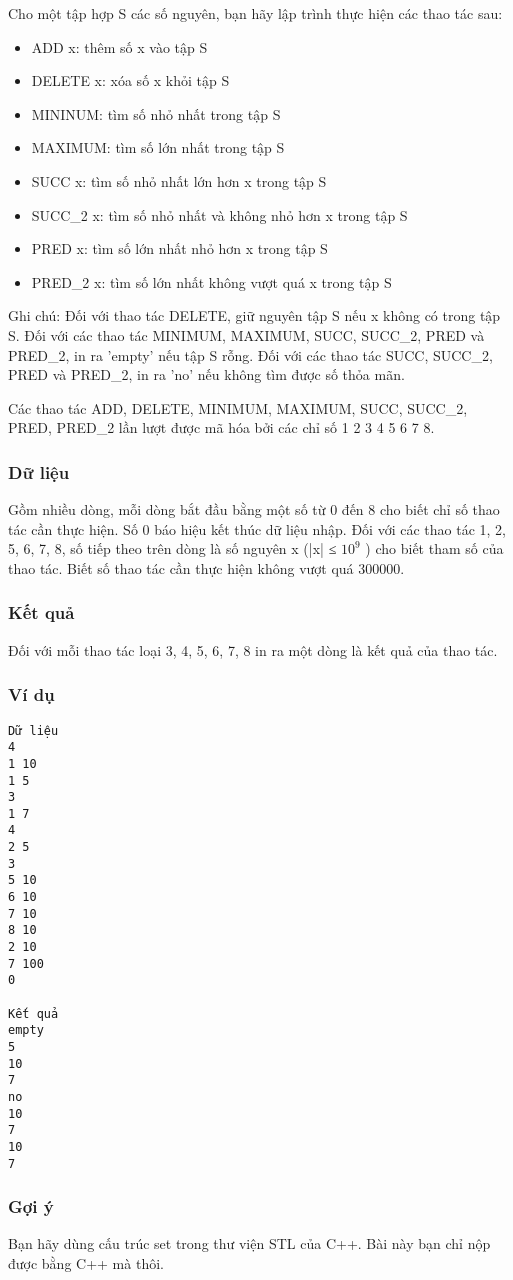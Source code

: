 



   Cho một tập hợp S các số nguyên, bạn hãy lập trình thực hiện các thao tác sau:  
\begin{itemize}
	\item     ADD x: thêm số x vào tập S   
	\item     DELETE x: xóa số x khỏi tập S   
	\item     MININUM: tìm số nhỏ nhất trong tập S   
	\item     MAXIMUM: tìm số lớn nhất trong tập S   
	\item     SUCC x: tìm số nhỏ nhất lớn hơn x trong tập S   
	\item     SUCC\_2 x: tìm số nhỏ nhất và không nhỏ hơn x trong tập S   
	\item     PRED x: tìm số lớn nhất nhỏ hơn x trong tập S   
	\item     PRED\_2 x: tìm số lớn nhất không vượt quá x trong tập S   
\end{itemize}

   Ghi chú: Đối với thao tác DELETE, giữ nguyên tập S nếu x không có trong tập S. Đối với các thao tác MINIMUM, MAXIMUM, SUCC, SUCC\_2, PRED và PRED\_2, in ra 'empty' nếu tập S rỗng. Đối với các thao tác SUCC, SUCC\_2, PRED và PRED\_2, in ra 'no' nếu không tìm được số thỏa mãn.  

   Các thao tác ADD, DELETE, MINIMUM, MAXIMUM, SUCC, SUCC\_2, PRED, PRED\_2 lần lượt được mã hóa bởi các chỉ số 1 2 3 4 5 6 7 8.  

\subsubsection{   Dữ liệu  }

   Gồm nhiều dòng, mỗi dòng bắt đầu bằng một số từ 0 đến 8 cho biết chỉ số thao tác cần thực hiện. Số 0 báo hiệu kết thúc dữ liệu nhập. Đối với các thao tác 1, 2, 5, 6, 7, 8, số tiếp theo trên dòng là số nguyên x (|x| ≤ $10^{9}$   ) cho biết tham số của thao tác. Biết số thao tác cần thực hiện không vượt quá 300000.  

\subsubsection{   Kết quả  }

   Đối với mỗi thao tác loại 3, 4, 5, 6, 7, 8 in ra một dòng là kết quả của thao tác.  

\subsubsection{   Ví dụ  }
\begin{verbatim}
Dữ liệu
4
1 10
1 5
3
1 7
4
2 5
3
5 10
6 10
7 10
8 10
2 10
7 100
0

Kết quả
empty
5
10
7
no
10
7
10
7
\end{verbatim}

\subsubsection{   Gợi ý  }

   Bạn hãy dùng cấu trúc set trong thư viện STL của C++. Bài này bạn chỉ nộp được bằng C++ mà thôi.  
